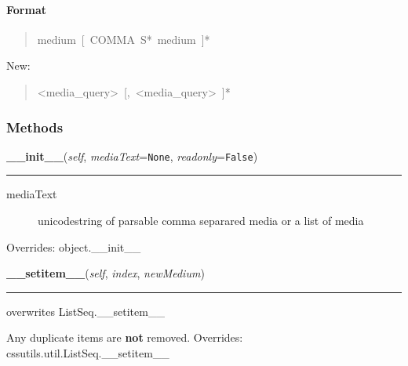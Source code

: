 
\hypertarget{format}{}
\paragraph*{Format}
\label{format}
\begin{quote}{\ttfamily \raggedright \noindent
medium~{[}~COMMA~S*~medium~{]}*
}\end{quote}

New:
\begin{quote}{\ttfamily \raggedright \noindent
<media{\_}query>~{[},~<media{\_}query>~{]}*
}\end{quote}


  \subsubsection{Methods}

    \vspace{0.5ex}

\hspace{.8\funcindent}\begin{boxedminipage}{\funcwidth}

    \raggedright \textbf{\_\_init\_\_}(\textit{self}, \textit{mediaText}={\tt None}, \textit{readonly}={\tt False})

    \vspace{-1.5ex}

    \rule{\textwidth}{0.5\fboxrule}
\setlength{\parskip}{2ex}
\begin{description}
\item[{mediaText}] \leavevmode 
unicodestring of parsable comma separared media
or a list of media

\end{description}
\setlength{\parskip}{1ex}
      Overrides: object.\_\_init\_\_

    \end{boxedminipage}

    \vspace{0.5ex}

\hspace{.8\funcindent}\begin{boxedminipage}{\funcwidth}

    \raggedright \textbf{\_\_setitem\_\_}(\textit{self}, \textit{index}, \textit{newMedium})

    \vspace{-1.5ex}

    \rule{\textwidth}{0.5\fboxrule}
\setlength{\parskip}{2ex}

overwrites ListSeq.{\_}{\_}setitem{\_}{\_}

Any duplicate items are \textbf{not} removed.
\setlength{\parskip}{1ex}
      Overrides: cssutils.util.ListSeq.\_\_setitem\_\_

    \end{boxedminipage}

